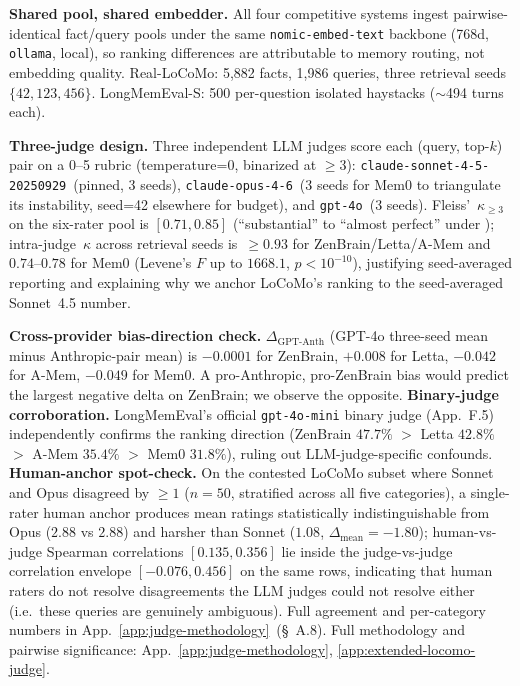 \documentclass{article}
\begin{document}
\textbf{Shared pool, shared embedder.} All four competitive systems
ingest pairwise-identical fact/query pools under the same
\texttt{nomic-embed-text} backbone (768d, \texttt{ollama}, local), so
ranking differences are attributable to memory routing, not embedding
quality. Real-LoCoMo: 5{,}882 facts, 1{,}986 queries, three retrieval
seeds $\{42,123,456\}$. LongMemEval-S: 500 per-question isolated
haystacks ($\sim$494 turns each).

\textbf{Three-judge design.} Three independent LLM judges score each
(query, top-$k$) pair on a 0--5 rubric (temperature=0, binarized at
$\geq 3$): \texttt{claude-sonnet-4-5-20250929}~(pinned, 3 seeds),
\texttt{claude-opus-4-6}~(3 seeds for Mem0 to triangulate its
instability, seed=42 elsewhere for budget), and \texttt{gpt-4o}~(3 seeds).
Fleiss'~$\kappa_{\geq 3}$ on the six-rater pool is $[0.71, 0.85]$
(``substantial'' to ``almost perfect'' under \citealp{landis1977});
intra-judge~$\kappa$ across retrieval seeds is~$\geq 0.93$ for
ZenBrain/Letta/A-Mem and $0.74$--$0.78$ for
Mem0 (Levene's $F$ up to $1668.1$, $p<10^{-10}$),
justifying seed-averaged reporting and explaining why we anchor
LoCoMo's ranking to the seed-averaged Sonnet~4.5 number.

\textbf{Cross-provider bias-direction check.} $\Delta_{\text{GPT-Anth}}$
(GPT-4o three-seed mean minus Anthropic-pair mean) is $-0.0001$ for
ZenBrain, $+0.008$ for Letta, $-0.042$ for A-Mem,
$-0.049$ for Mem0. A pro-Anthropic, pro-ZenBrain bias would
predict the largest negative delta on ZenBrain; we observe the opposite.
\textbf{Binary-judge corroboration.} LongMemEval's official
\texttt{gpt-4o-mini} binary judge (App.~F.5) independently confirms the
ranking direction (ZenBrain $47.7\%$ $>$ Letta $42.8\%$ $>$
A-Mem $35.4\%$ $>$ Mem0 $31.8\%$), ruling out
LLM-judge-specific confounds.
\textbf{Human-anchor spot-check.} On the contested LoCoMo subset
where Sonnet and Opus disagreed by $\geq 1$ ($n{=}50$, stratified
across all five categories), a single-rater human anchor produces
mean ratings statistically indistinguishable from Opus ($2.88$ vs
$2.88$) and harsher than Sonnet ($1.08$, $\Delta_{\text{mean}}{=}{-}1.80$);
human-vs-judge Spearman correlations $[0.135, 0.356]$ lie inside the
judge-vs-judge correlation envelope $[-0.076, 0.456]$ on the same
rows, indicating that human raters do not resolve disagreements the
LLM judges could not resolve either (i.e.\ these queries are
genuinely ambiguous). Full agreement and per-category numbers in
App.~\ref{app:judge-methodology}~(\S~A.8). Full methodology and pairwise
significance: App.~\ref{app:judge-methodology},
\ref{app:extended-locomo-judge}.
\end{document}
